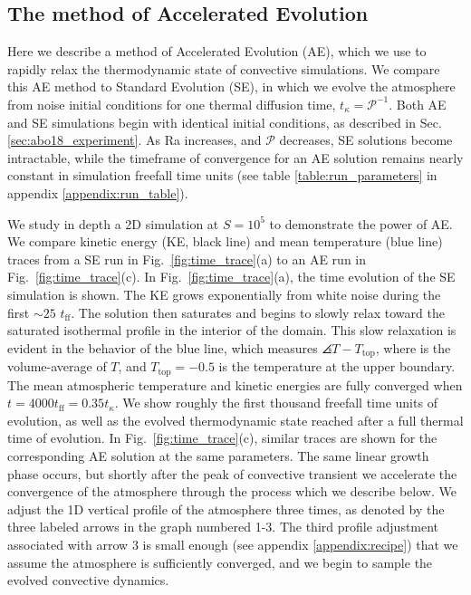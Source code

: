 
\subsection{The method of Accelerated Evolution}
\label{sec:abo18_ae}
Here we describe a method of Accelerated Evolution (AE), which we use to rapidly relax the thermodynamic state of convective simulations.  
We compare this AE method to Standard Evolution (SE), in which we evolve the atmosphere from noise initial conditions for one thermal diffusion time, $t_\kappa = \mathcal{P}^{-1}$. 
Both AE and SE simulations begin with identical initial conditions, as described in Sec. \ref{sec:abo18_experiment}.
As Ra increases, and $\mathcal{P}$ decreases, SE solutions become intractable, while the timeframe of convergence for an AE solution remains nearly constant in simulation freefall time units (see table \ref{table:run_parameters} in appendix \ref{appendix:run_table}).

We study in depth a 2D simulation at $S = 10^5$ to demonstrate the power of AE.
We compare kinetic energy (KE, black line) and mean temperature (blue line) traces from a SE run in Fig.~\ref{fig:time_trace}(a) to an AE run in Fig.~\ref{fig:time_trace}(c).
In Fig.~\ref{fig:time_trace}(a), the time evolution of the SE simulation is shown.
The KE grows exponentially from white noise during the first $\sim 25$ $t_{\text{ff}}$. 
The solution then saturates and begins to slowly relax toward the saturated isothermal profile in the interior of the domain.
This slow relaxation is evident in the behavior of the blue line, which measures $\angles{T} - T_{\text{top}}$, where  is the volume-average of $T$, and $T_{\text{top}} = -0.5$ is the temperature at the upper boundary.
The mean atmospheric temperature and kinetic energies are fully converged when $t = 4000t_{\text{ff}} = 0.35t_{\kappa}$.
We show roughly the first thousand freefall time units of evolution, as well as the evolved thermodynamic state reached after a full thermal time of evolution.  
In Fig.~\ref{fig:time_trace}(c), similar traces are shown for the corresponding AE solution at the same parameters. 
The same linear growth phase occurs, but shortly after the peak of convective transient we accelerate the convergence of the atmosphere through the process which we describe below. 
We adjust the 1D vertical profile of the atmosphere three times, as denoted by the three labeled arrows in the graph numbered 1-3.  
The third profile adjustment associated with arrow 3 is small enough (see appendix \ref{appendix:recipe}) that we assume the atmosphere is sufficiently converged, and we begin to sample the evolved convective dynamics.


